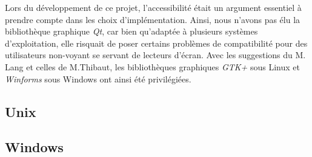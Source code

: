 Lors du développement de ce projet, l'accessibilité était un argument essentiel à prendre compte dans les choix d'implémentation. Ainsi, nous n'avons pas élu la bibliothèque graphique \textit{Qt}, car bien qu'adaptée à plusieurs systèmes d'exploitation, elle risquait de poser certains problèmes de compatibilité pour des utilisateurs non-voyant se servant de lecteurs d'écran.  
Avec les suggestions du M. Lang et celles de M.Thibaut, les bibliothèques graphiques \textit{GTK+} sous Linux et \textit{Winforms} sous Windows ont ainsi été privilégiées.

\subsection{Unix}


\subsection{Windows}



